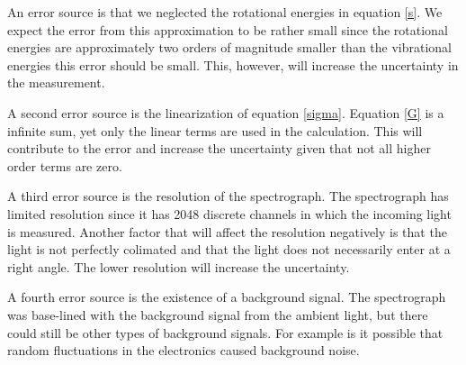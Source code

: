 \documentclass[12pt]{article}
\begin{document}
An error source is that we neglected the rotational energies in equation \ref{s}. We expect the error from this approximation to be rather small since the rotational energies are approximately two orders of magnitude smaller than the vibrational energies this error should be small. This, however, will increase the uncertainty in the measurement.

A second error source is the linearization of equation \ref{sigma}. Equation \ref{G} is a infinite sum, yet only the linear terms are used in the calculation. This will contribute to the error and increase the uncertainty given that not all higher order terms are zero.

A third error source is the resolution of the spectrograph. The spectrograph has limited resolution since it has 2048 discrete channels in which the incoming light is measured. Another factor that will affect the resolution negatively is that the light is not perfectly colimated and that the light does not necessarily enter at a right angle. The lower resolution will increase the uncertainty.

A fourth error source is the existence of a background signal. The spectrograph was base-lined with the background signal from the ambient light, but there could still be other types of background signals. For example is it possible that random fluctuations in the electronics caused background noise.

\printbibliography
\end{document}
